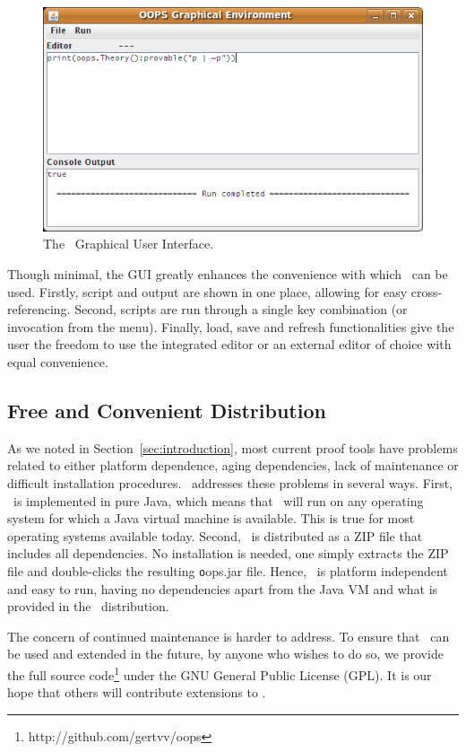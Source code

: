 \begin{figure}[p]
\centering
\includegraphics[scale=.55]{images/gui}
\caption{The \oops\ Graphical User Interface.}
\label{fig:gui}
\end{figure}

Though minimal, the GUI greatly enhances the convenience with which \oops\ can
be used. Firstly, script and output are shown in one place, allowing for easy
cross-referencing. Second, scripts are run through a single key combination
(or invocation from the menu). Finally, load, save and refresh functionalities
give the user the freedom to use the integrated editor or an external editor
of choice with equal convenience.

\subsection{Free and Convenient Distribution}

As we noted in Section~\ref{sec:introduction}, most current proof tools have
problems related to either platform dependence, aging dependencies, lack of
maintenance or difficult installation procedures. \oops\ addresses these
problems in several ways.
First, \oops\ is implemented in pure Java, which means that \oops\ will run on
any operating system for which a Java virtual machine is available. This is
true for most operating systems available today.
Second, \oops\ is distributed as a ZIP file that includes all dependencies.
No installation is needed, one simply extracts the ZIP file and double-clicks
the resulting {\texttt oops.jar} file.
Hence, \oops\ is platform independent and easy to run, having no dependencies
apart from the Java VM and what is provided in the \oops\ distribution.

The concern of continued maintenance is harder to address. To ensure that
\oops\ can be used and extended in the future, by anyone who wishes to do so,
we provide the full source code\footnote{http://github.com/gertvv/oops} under
the GNU General Public License (GPL). It is our hope that others will
contribute extensions to \oops.


